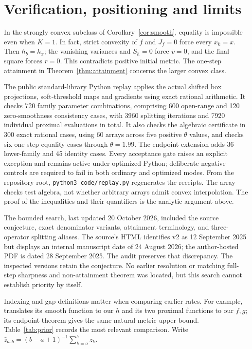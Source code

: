 \documentclass[11pt,a4paper]{article}
\theoremstyle{remark}\newtheorem{remark}[theorem]{Remark}
\begin{document}
\section{Verification, positioning and limits}

In the strongly convex subclass of Corollary~\ref{cor:smooth}, equality is impossible even when $K=1$. In fact, strict convexity of $f$ and $J_f=0$ force every $x_k=x$. Then $h_b=h_x$; the vanishing variances and $S_h=0$ force $\bar v=0$, and the final square forces $r=0$. This contradicts positive initial metric. The one-step attainment in Theorem~\ref{thm:attainment} concerns the larger convex class.

The public standard-library Python replay applies the actual shifted box projections, soft-threshold maps and gradients using exact rational arithmetic. It checks 720 family parameter combinations, comprising 600 open-range and 120 zero-smoothness consistency cases, with 3960 splitting iterations and 7920 individual proximal evaluations in total. It also checks the algebraic certificate in 300 exact rational cases, using 60 arrays across five positive $\theta$ values, and checks six one-step equality cases through $\theta=1.99$. The endpoint extension adds 36 lower-family and 45 identity cases. Every acceptance gate raises an explicit exception and remains active under optimized Python; deliberate negative controls are required to fail in both ordinary and optimized modes. From the repository root, \texttt{python3 code/replay.py} regenerates the receipts. The array checks test algebra, not whether arbitrary arrays admit convex interpolation. The proof of the inequalities and their quantifiers is the analytic argument above.

The bounded search, last updated 20 October 2026, included the source conjecture, exact denominator variants, attainment terminology, and three-operator splitting aliases. The source's HTML identifies v2 as 12 September 2025 but displays an internal manuscript date of 24 August 2026; the author-hosted PDF is dated 28 September 2025. The audit preserves that discrepancy. The inspected versions retain the conjecture. No earlier resolution or matching full-step sharpness and non-attainment theorem was located, but this search cannot establish priority by itself.

Indexing and gap definitions matter when comparing earlier rates. For example, \cite{pedregosa2018} translates its smooth function to our $h$ and its two proximal functions to our $f,g$; its endpoint theorem gives the same natural-metric upper bound. Table~\ref{tab:prior} records the most relevant comparison. Write $\bar z_{a:b}=(b-a+1)^{-1}\sum_{k=a}^b z_k$.
\end{document}
